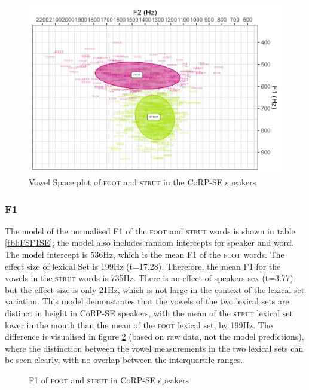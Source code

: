 \documentclass[12pt,a4paper,notitlepage,
bibliography=totoc,
numbers=endperiod,
appendixprefix=true,
usenames,dvipsnames]{scrartcl}
\let\Oldsubsubsection\subsubsection
\renewcommand{\subsubsection}{\FloatBarrier\Oldsubsubsection}
\newcommand{\scs}{\textsc}
\newcommand{\foot}{\scs{foot}}
\newcommand{\strutt}{\scs{strut}}
\begin{document}
\begin{figure}[h]
	\centering
	\includegraphics[width=\textwidth]{../figures/FS-SE-vplot.png}
	\caption{Vowel Space plot of \foot{} and \strutt{} in the CoRP-SE speakers} \label{fig:FSvplotSE}
\end{figure}

\subsubsection{F1} \label{subsubsec:SEF1}
The model of the normalised F1 of the \foot{}  and \strutt{}  words is shown in table \ref{tbl:FSF1SE}; the model also includes random intercepts for speaker and word. The model intercept is 536Hz, which is the mean F1 of the \foot{} words. The effect size of lexical Set is 199Hz (t=17.28). Therefore, the mean F1 for the vowels in the \strutt{} words is 735Hz. There is an effect of speakers sex (t=3.77) but the effect size is only 21Hz, which is not large in the context of the lexical set variation. This model demonstrates that the vowels of the two lexical sets are distinct in height in CoRP-SE speakers, with the mean of the \strutt{} lexical set lower in the mouth than the mean of the \foot{} lexical set, by 199Hz. The difference is visualised in figure \ref{fig:FSF1SE} (based on raw data, not the model predictions), where the distinction between the vowel measurements in the two lexical sets can be seen clearly, with no overlap between the interquartile ranges.



\begin{figure}[h]
	\centering
	
	\caption{F1 of \foot{} and \strutt{} in CoRP-SE speakers} \label{fig:FSF1SE}
\end{figure}
\end{document}
